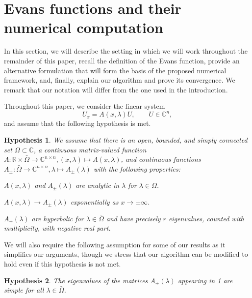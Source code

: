 \documentclass[10pt]{article}
\newtheorem{Hypothesis}{Hypothesis}
\numberwithin{equation}{section}
\newcommand{\C}{\mathbb{C}}
\newcommand{\R}{\mathbb{R}}
\begin{document}

\section{Evans functions and their numerical computation}\label{s2}

In this section, we will describe the setting in which we will work throughout the remainder of this paper, recall the definition of the Evans function, provide an alternative formulation that will form the basis of the proposed numerical framework, and, finally, explain our algorithm and prove its convergence. We remark that our notation will differ from the one used in the introduction.

Throughout this paper, we consider the linear system
\begin{equation}\label{e10}
U_x = A(x,\lambda) U, \qquad U\in\C^n,
\end{equation}
and assume that the following hypothesis is met.

\begin{Hypothesis}\label{h1}
We assume that there is an open, bounded, and simply connected set $\Omega\subset\C$, a continuous matrix-valued function $A: \R\times\bar\Omega\to\C^{n\times n}, (x,\lambda)\mapsto A(x,\lambda)$, and continuous functions $A_\pm:\bar\Omega\to\C^{n\times n}, \lambda\mapsto A_\pm(\lambda)$ with the following properties:
\begin{compactenum}
\item $A(x,\lambda)$ and $A_\pm(\lambda)$ are analytic in $\lambda$ for $\lambda\in\Omega$.
\item $A(x,\lambda)\to A_\pm(\lambda)$ exponentially as $x\to\pm\infty$.
\item $A_\pm(\lambda)$ are hyperbolic for $\lambda\in\bar\Omega$ and have precisely $r$ eigenvalues, counted with multiplicity, with negative real part.
\end{compactenum}
\end{Hypothesis}

We will also require the following assumption for some of our results as it simplifies our arguments, though we stress that our algorithm can be modified to hold even if this hypothesis is not met.

\begin{Hypothesis}\label{h2}
The eigenvalues of the matrices $A_\pm(\lambda)$ appearing in \ref{h1} are simple for all $\lambda\in\bar\Omega$.
\end{Hypothesis}
\end{document}
